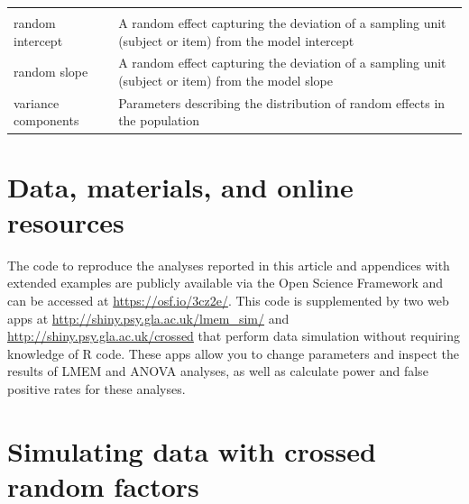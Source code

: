 \documentclass[doc,floatsintext]{apa6}
\begin{document}
\begin{tcolorbox}[colback=black!5!white,colframe=white!5!black,title=Box 1. Glossary of terms]
\begin{longtable}[]{@{}ll@{}}
\begin{minipage}[t]{0.65\columnwidth}
\end{minipage}\tabularnewline
\begin{minipage}[t]{0.29\columnwidth}\raggedright
random intercept\strut
\end{minipage} & \begin{minipage}[t]{0.65\columnwidth}\raggedright
A random effect capturing the deviation of a sampling unit (subject or item) from the model intercept\strut
\end{minipage}\tabularnewline
\begin{minipage}[t]{0.29\columnwidth}\raggedright
random slope\strut
\end{minipage} & \begin{minipage}[t]{0.65\columnwidth}\raggedright
A random effect capturing the deviation of a sampling unit (subject or item) from the model slope\strut
\end{minipage}\tabularnewline
\begin{minipage}[t]{0.29\columnwidth}\raggedright
variance components\strut
\end{minipage} & \begin{minipage}[t]{0.65\columnwidth}\raggedright
Parameters describing the distribution of random effects in the
population\strut
\end{minipage}\tabularnewline
\end{longtable}
\end{tcolorbox}

\section{Data, materials, and online
resources}\label{data-materials-and-online-resources}

The code to reproduce the analyses reported in this article and
appendices with extended examples are publicly available via the Open
Science Framework and can be accessed at \url{https://osf.io/3cz2e/}.
This code is supplemented by two web apps at
\url{http://shiny.psy.gla.ac.uk/lmem_sim/} and
\url{http://shiny.psy.gla.ac.uk/crossed} that perform data simulation
without requiring knowledge of R code. These apps allow you to change
parameters and inspect the results of LMEM and ANOVA analyses, as well
as calculate power and false positive rates for these analyses.

\section{Simulating data with crossed random
factors}\label{simulating-data-with-crossed-random-factors}
\end{document}
